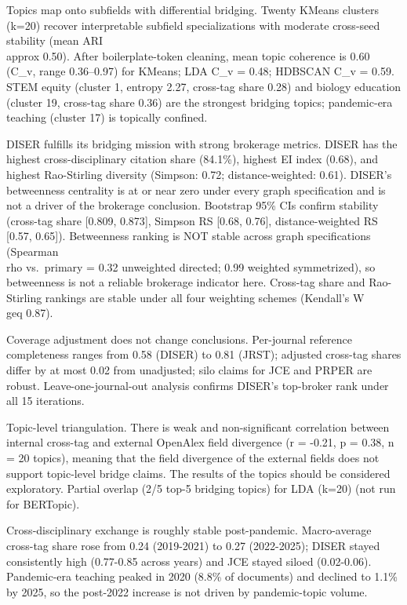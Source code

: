 \documentclass[pdflatex,sn-apa]{sn-jnl}
\begin{document}
Topics map onto subfields with differential bridging. Twenty KMeans
clusters (k=20) recover interpretable subfield specializations with
moderate cross-seed stability (mean ARI \\approx 0.50). After boilerplate-token
cleaning, mean topic coherence is 0.60 (C\_v, range 0.36--0.97) for
KMeans; LDA C\_v = 0.48; HDBSCAN C\_v = 0.59. STEM equity (cluster 1,
entropy 2.27, cross-tag share 0.28) and biology education (cluster 19,
cross-tag share 0.36) are the strongest bridging topics; pandemic-era
teaching (cluster 17) is topically confined.

DISER fulfills its bridging mission with strong brokerage metrics. DISER
has the highest cross-disciplinary citation share (84.1\%), highest EI
index (0.68), and highest Rao-Stirling diversity (Simpson: 0.72;
distance-weighted: 0.61). DISER's betweenness centrality is at or near
zero under every graph specification and is not a driver of the
brokerage conclusion. Bootstrap 95\% CIs confirm stability (cross-tag
share {[}0.809, 0.873{]}, Simpson RS {[}0.68, 0.76{]}, distance-weighted
RS {[}0.57, 0.65{]}). Betweenness ranking is NOT stable across graph
specifications (Spearman \\rho vs.~primary = 0.32 unweighted directed; 0.99
weighted symmetrized), so betweenness is not a reliable brokerage
indicator here. Cross-tag share and Rao-Stirling rankings are stable
under all four weighting schemes (Kendall's W \\geq 0.87).

Coverage adjustment does not change conclusions. Per-journal reference
completeness ranges from 0.58 (DISER) to 0.81 (JRST); adjusted cross-tag
shares differ by at most 0.02 from unadjusted; silo claims for JCE and
PRPER are robust. Leave-one-journal-out analysis confirms DISER's
top-broker rank under all 15 iterations.

Topic-level triangulation. There is weak and non-significant correlation
between internal cross-tag and external OpenAlex field divergence (r =
-0.21, p = 0.38, n = 20 topics), meaning that the field divergence of
the external fields does not support topic-level bridge claims. The
results of the topics should be considered exploratory. Partial overlap
(2/5 top-5 bridging topics) for LDA (k=20) (not run for BERTopic).

Cross-disciplinary exchange is roughly stable post-pandemic.
Macro-average cross-tag share rose from 0.24 (2019-2021) to 0.27
(2022-2025); DISER stayed consistently high (0.77-0.85 across years) and
JCE stayed siloed (0.02-0.06). Pandemic-era teaching peaked in 2020
(8.8\% of documents) and declined to 1.1\% by 2025, so the post-2022
increase is not driven by pandemic-topic volume.
\end{document}
